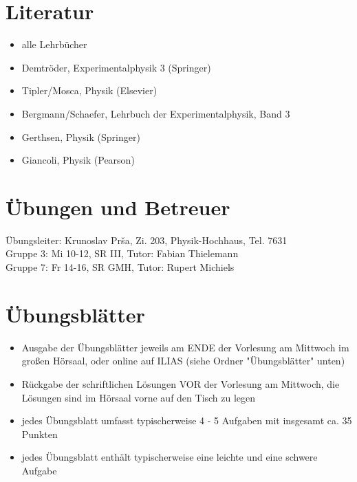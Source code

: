 \documentclass[titlepage,11pt,a4paper,ngerman]{report}
\begin{document}
\section{Literatur}
\begin{itemize}
	\item alle Lehrbücher
	\item Demtröder, Experimentalphysik 3 (Springer)
	\item Tipler/Mosca, Physik (Elsevier)
	\item Bergmann/Schaefer, Lehrbuch der Experimentalphysik, Band 3
	\item Gerthsen, Physik (Springer)
	\item Giancoli, Physik (Pearson)
\end{itemize}

\section{Übungen und Betreuer}
 
Übungsleiter: Krunoslav Prša, Zi. 203, Physik-Hochhaus, Tel. 7631\\
Gruppe 3: Mi 10-12, SR III, Tutor: Fabian Thielemann\\
Gruppe 7: Fr 14-16, SR GMH, Tutor: Rupert Michiels
 
\section{Übungsblätter}
\begin{itemize}
	\item Ausgabe der Übungsblätter jeweils am ENDE der Vorlesung am Mittwoch im großen Hörsaal, oder online auf ILIAS (siehe Ordner "Übungsblätter" unten)
	\item Rückgabe der schriftlichen Lösungen VOR der Vorlesung am Mittwoch, die Lösungen sind im Hörsaal vorne auf den Tisch zu legen
	\item jedes Übungsblatt umfasst typischerweise 4 - 5 Aufgaben mit insgesamt ca. 35 Punkten
	\item jedes Übungsblatt enthält typischerweise eine leichte und eine schwere Aufgabe
\end{itemize}
\end{document}
